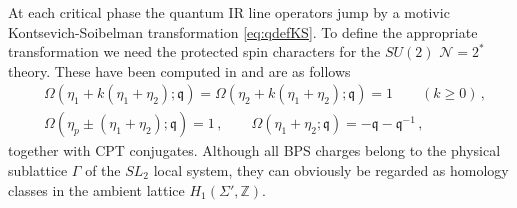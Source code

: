 \documentclass{article}
\numberwithin{equation}{section}
\newcommand{\IZ}{\mathbb{Z}}
\newcommand{\mq}{\mathfrak{q}}
\def\be{\begin{equation}}
\def\ee{\end{equation}}
\def\IZ{{\mathbb{Z}}}
\def\CN{{\mathcal{N}}}
\def\fY{\Gamma}
\begin{document}
At each critical phase the quantum IR line operators jump by a {motivic Kontsevich-Soibelman transformation} \eqref{eq:qdefKS}.
To define the appropriate transformation we need the protected spin characters for the $SU(2)$ $\CN=2^*$ theory. These have been computed in \cite[Section 4.5]{Longhi:2016wtv} and are as follows
\be\label{eq:BPS-spectrum-motivic}
\begin{split}
	&\Omega(\eta_1 + k(\eta_1+\eta_2);\mq) = \Omega(\eta_2 + k(\eta_1+\eta_2);\mq) = 1
	\qquad(k\geq 0)\,,
	\\
	& \Omega(\eta_p \pm (\eta_1+\eta_2);\mq ) =  1 \,,
	\qquad
	\Omega(\eta_1+\eta_2;\mq) = -\mq-\mq^{-1}\,,
\end{split}
\ee
together with CPT conjugates.
Although all BPS charges belong to the physical sublattice $\fY$ of the ${SL}_2$ local system, they can obviously be regarded as homology classes in the ambient lattice $H_1(\Sigma',\IZ)$.


\end{document}
